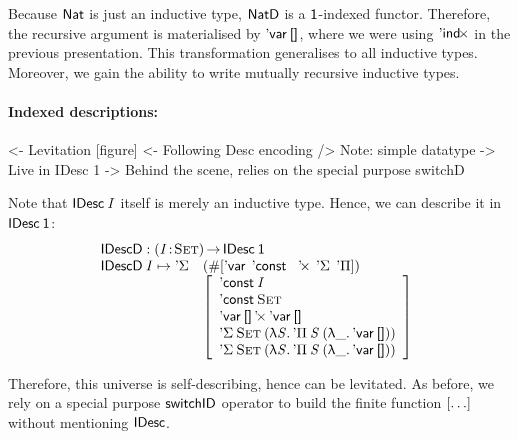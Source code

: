 Because $\Nat$ is just an inductive type, $\NatD$ is a $\Unit$-indexed
functor. Therefore, the recursive argument is materialised by
$\DVar{\Void}$, where we were using $\SYMBDIndx$ in the previous
presentation. This transformation generalises to all inductive
types. Moreover, we gain the ability to write mutually recursive
inductive types.



\paragraph{Indexed descriptions:}

\begin{wstructure}
<- Levitation [figure]
    <- Following Desc encoding
        /> Note: simple datatype
            -> Live in IDesc 1
    -> Behind the scene, relies on the special purpose switchD
\end{wstructure}

Note that $\IDesc{\V{I}}$ itself is merely an inductive type. Hence,
we can describe it in $\IDesc{\Unit}$:
%
\[\stk{
\IDescD : \PI{\V{I}}{\Set} \IDesc{\Unit} \\
\begin{array}{@{}ll}
\IDescD\: \V{I} \mapsto \SYMBDSigma & (\EnumT \sqr{ 
                                          \SYMBDVar\:\:
                                          \SYMBDConst\:\:
                                          \DProd\:\:
                                          \SYMBDSigma\:\:
                                          \SYMBDPi
                                             }) \\
                              & \bigRedBracket{\begin{array}{l}
                                      \DConst{\V{I}}                  \\
                                      \DConst{\Set}               \\
                                      \DProd{\DVar{\Void}}{\DVar{\Void}}  \\
                                      \DSigma{\Set}{(\LAM{\V{S}} \DPi{\V{S}}{(\LAM{\_} \DVar{\Void})})} \\
                                      \DSigma{\Set}{(\LAM{\V{S}} \DPi{\V{S}}{(\LAM{\_} \DVar{\Void})})}
                                   \end{array}}
\end{array}
}\]

Therefore, this universe is self-describing, hence can be
levitated. As before, we rely on a special purpose $\F{switchID}$
operator to build the finite function $\bigRedBracket{\ldots}$
without mentioning \(\SYMBIDesc\).

